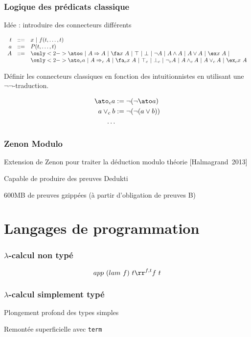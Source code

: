 \documentclass[12pt,aspectratio=169]{beamer}
\newcommand\lst[1]{{\lstinline{#1}}}
\begin{document}
\begin{frame}[fragile]
  \frametitle{Logique des prédicats classique}
  Idée : introduire des connecteurs différents
  
 $$
  \begin{array}{r@{~~~::=~~~}l}
    t & x~|~f(t,\ldots,t)\\
    a & P(t,\ldots,t)\\
  A&\only<2->{\ato}a~|~A \Rightarrow
  A~|~\fa x~A~|~\top~|~\bot~|~\neg A~|~A \wedge A~|~A \vee A~|~\ex
  x~A~|~\\
  \multicolumn{1}{c}{}&\only<2->{\ato_c}a~|~A \Rightarrow_c
  A~|~\fa_c x~A~|~\top_c~|~\bot_c~|~\neg_c A~|~A \wedge_c A~|~A \vee_c A~|~\ex_c x~A
  \end{array}
  $$
  
  Définir les connecteurs classiques en fonction des intuitionnistes
  en utilisant une $\neg\neg$-traduction.

  \begin{align*}
    \ato_c a&:= \neg(\neg\ato a)\\
    a\vee_c b&:= \neg(\neg(a\vee b))\\
    \dots
  \end{align*}
\end{frame}

\begin{frame}
  \frametitle{Zenon Modulo}
  Extension de Zenon pour traiter la déduction modulo théorie
  [Halmagrand~2013]
  \bigskip
  
  Capable de produire des preuves Dedukti
  \medskip
  
  600MB de preuves gzippées (à partir d'obligation de preuves B)
\end{frame}

\section{Langages de programmation}
\begin{frame}
  \frametitle{$\lambda$-calcul non typé}

  $$app~(lam~f)~t \rr^{f,t} f~t$$
\end{frame}

\begin{frame}
  \frametitle{$\lambda$-calcul simplement typé}
  Plongement profond des types simples

  Remontée superficielle avec \lst{term}
\end{frame}
\end{document}
